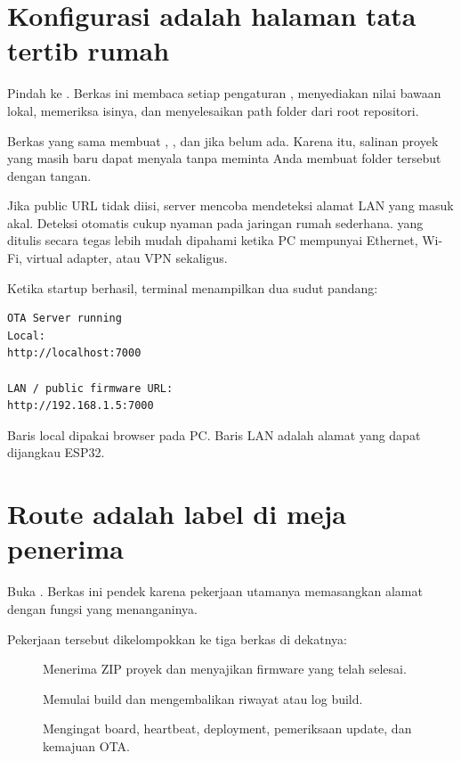 \section{Konfigurasi adalah halaman tata tertib rumah}

Pindah ke . Berkas ini membaca setiap pengaturan , menyediakan nilai bawaan lokal, memeriksa isinya, dan menyelesaikan path folder dari root repositori.

Berkas yang sama membuat , , dan  jika belum ada. Karena itu, salinan proyek yang masih baru dapat menyala tanpa meminta Anda membuat folder tersebut dengan tangan.

Jika public URL tidak diisi, server mencoba mendeteksi alamat LAN yang masuk akal. Deteksi otomatis cukup nyaman pada jaringan rumah sederhana.  yang ditulis secara tegas lebih mudah dipahami ketika PC mempunyai Ethernet, Wi-Fi, virtual adapter, atau VPN sekaligus.

Ketika startup berhasil, terminal menampilkan dua sudut pandang:

\begin{lstlisting}[numbers=none]
OTA Server running
Local:
http://localhost:7000

LAN / public firmware URL:
http://192.168.1.5:7000
\end{lstlisting}

Baris local dipakai browser pada PC. Baris LAN adalah alamat yang dapat dijangkau ESP32.

\section{Route adalah label di meja penerima}

Buka . Berkas ini pendek karena pekerjaan utamanya memasangkan alamat dengan fungsi yang menanganinya.

Pekerjaan tersebut dikelompokkan ke tiga berkas di dekatnya:

\begin{description}
  \item[] Menerima ZIP proyek dan menyajikan firmware yang telah selesai.
  \item[] Memulai build dan mengembalikan riwayat atau log build.
  \item[] Mengingat board, heartbeat, deployment, pemeriksaan update, dan kemajuan OTA.
\end{description}

